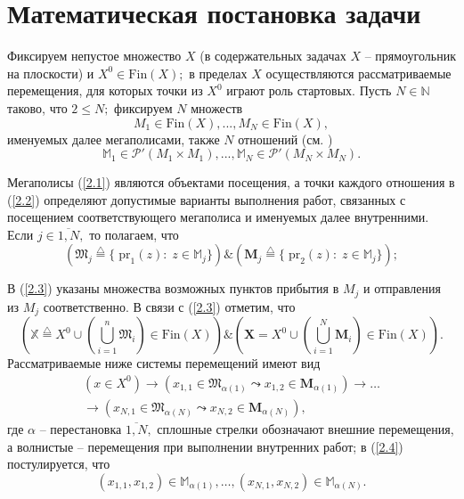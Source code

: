 \documentclass[10pt]{SPIIRAS_Proceedings}
\begin{document}
\section{Математическая постановка задачи}
\label{sec:2}

Фиксируем непустое множество $X$
(в содержательных задачах \cite{4}
$X$ -- прямоугольник на плоскости)
и $X^0 \in \mathrm{Fin}(X);$
в пределах $X$ осуществляются рассматриваемые перемещения,
для которых точки из $X^0$ играют роль стартовых.
Пусть $N \in \mathbb{N}$ таково,
что $2 \le N;$
фиксируем $N$ множеств
\begin{equation}\label{2.1}
M_1 \in \mathrm{Fin}(X),...,M_N \in \mathrm{Fin}(X),
\end{equation}
именуемых далее мегаполисами,
также $N$ отношений (см. \cite[гл.II,$\S$4]{15})
\begin{equation}\label{2.2}
\mathbb{M}_1 \in \mathcal{P}'(M_1 \times M_1),...,\mathbb{M}_N \in \mathcal{P}'(M_N \times M_N).
\end{equation}

Мегаполисы (\ref{2.1})
являются объектами посещения,
а точки каждого отношения в (\ref{2.2})
определяют допустимые варианты выполнения работ,
связанных с посещением соответствующего мегаполиса и именуемых далее внутренними.
Если $j \in \overline{1,N},$
то полагаем, что
\begin{equation}\label{2.3}
(\mathfrak{M}_j \stackrel{\triangle}{=}
\{\;\mathrm{pr}_1(z):\;z \in \mathbb{M}_j\})
\& (\mathbf{M}_j \stackrel{\triangle}{=}
\{\;\mathrm{pr}_2(z):\;z \in \mathbb{M}_j\});
\end{equation}

В (\ref{2.3}) указаны множества возможных пунктов прибытия в $M_j$
и отправления из $M_j$ соответственно.
В связи с (\ref{2.3})
отметим, что
$$
(\mathbb{X} \stackrel{\triangle}{=} X^0 \cup
(\bigcup\limits_{i=1}^n \mathfrak{M}_i) \in \mathrm{Fin}(X))
\& (\mathbf{X} = X^0 \cup (\bigcup\limits_{i=1}^N \mathbf{M}_i) \in \mathrm{Fin}(X)).
$$
Рассматриваемые ниже системы перемещений имеют вид
\begin{equation}\label{2.4}
  \begin{aligned}
    (x \in X^0)
    \to
    (x_{1,1} \in \mathfrak{M}_{\alpha(1)} \leadsto x_{1,2} \in \mathbf{M}_{\alpha(1)})
    \to \dots \\
    \to
    (x_{N,1} \in \mathfrak{M}_{\alpha(N)} \leadsto x_{N,2} \in \mathbf{M}_{\alpha(N)}),
  \end{aligned}
\end{equation}
где $\alpha$ -- перестановка $\overline{1,N},$
сплошные стрелки обозначают внешние перемещения,
а волнистые -- перемещения при выполнении внутренних работ;
в (\ref{2.4}) постулируется, что
\begin{equation}\label{2.5}
  (x_{1,1},x_{1,2}) \in \mathbb{M}_{\alpha(1)},
  \dots,
  (x_{N,1},x_{N,2}) \in \mathbb{M}_{\alpha(N)}.
\end{equation}
\end{document}
